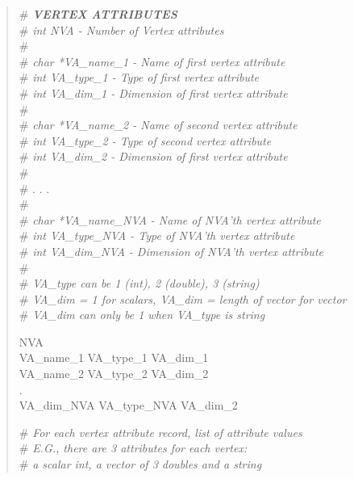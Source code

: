 \documentclass[12pt]{article}
\begin{document}
\begin{verse}
\# \textit{\textbf{VERTEX ATTRIBUTES}} \\
\# \textit{int NVA - Number of Vertex attributes} \\
\# \\
\# \textit{char *VA\_name\_1 - Name of first vertex attribute} \\
\# \textit{int VA\_type\_1 - Type of first vertex attribute} \\
\# \textit{int VA\_dim\_1 - Dimension of first vertex attribute} \\
\# \\
\# \textit{char *VA\_name\_2 - Name of second vertex attribute} \\
\# \textit{int VA\_type\_2 - Type of second vertex attribute} \\
\# \textit{int VA\_dim\_2 - Dimension of first vertex attribute} \\
\# \\
\# . . .\\
\# \\
\# \textit{char *VA\_name\_NVA - Name of NVA'th vertex attribute} \\
\# \textit{int VA\_type\_NVA - Type of NVA'th vertex attribute} \\
\# \textit{int VA\_dim\_NVA - Dimension of NVA'th vertex attribute} \\
\# \\
\# \textit{VA\_type can be 1 (int), 2 (double), 3 (string)} \\
\# \textit{VA\_dim = 1 for scalars, VA\_dim = length of vector for vector} \\
\# \textit{VA\_dim can only be 1 when VA\_type is string}
\vspace{1ex}

NVA \hspace{0.5ex} \\
VA\_name\_1 \hspace{0.5ex} VA\_type\_1 \hspace{0.5ex} VA\_dim\_1 \\ 
VA\_name\_2 \hspace{0.5ex} VA\_type\_2 \hspace{0.5ex} VA\_dim\_2 \\
. \\
VA\_dim\_NVA \hspace{0.5ex} VA\_type\_NVA \hspace{0.5ex} VA\_dim\_2  
\vspace{1ex}

\# \textit{For each vertex attribute record, list of attribute values} \\
\# \textit{E.G., there are 3 attributes for each vertex:} \\
\# \textit{a scalar int, a vector of 3 doubles and a string}


\end{verse}
\end{document}
